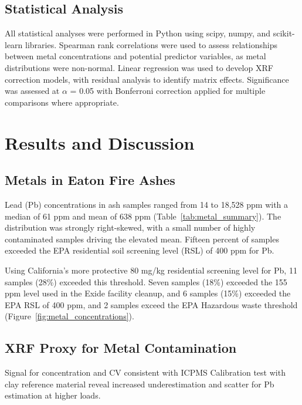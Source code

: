 \documentclass[12pt,letterpaper]{article}
\begin{document}
\subsection{Statistical Analysis}

All statistical analyses were performed in Python using scipy, numpy, and scikit-learn libraries. Spearman rank correlations were used to assess relationships between metal concentrations and potential predictor variables, as metal distributions were non-normal. Linear regression was used to develop XRF correction models, with residual analysis to identify matrix effects. Significance was assessed at $\alpha$ = 0.05 with Bonferroni correction applied for multiple comparisons where appropriate.

\section{Results and Discussion}

\subsection{Metals in Eaton Fire Ashes}

Lead (Pb) concentrations in ash samples ranged from 14 to 18,528 ppm with a median of 61 ppm and mean of 638 ppm (Table~\ref{tab:metal_summary}). The distribution was strongly right-skewed, with a small number of highly contaminated samples driving the elevated mean. Fifteen percent of samples exceeded the EPA residential soil screening level (RSL) of 400 ppm for Pb.

Using California's more protective 80 mg/kg residential screening level for Pb, 11 samples (28\%) exceeded this threshold. Seven samples (18\%) exceeded the 155 ppm level used in the Exide facility cleanup, and 6 samples (15\%) exceeded the EPA RSL of 400 ppm, and 2 samples exceed the EPA Hazardous waste threshold (Figure~\ref{fig:metal_concentrations}).

\subsection{XRF Proxy for Metal Contamination}

Signal for concentration and CV consistent with ICPMS
Calibration test with clay reference material reveal increased underestimation and scatter for Pb estimation at higher loads. 
\end{document}
